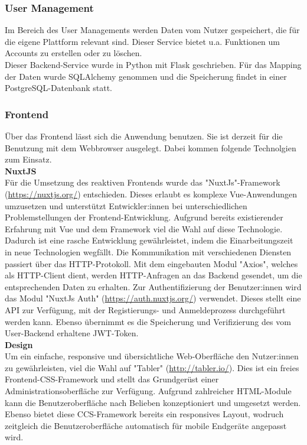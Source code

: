 \subsubsection{User Management}

Im Bereich des User Managements werden Daten vom Nutzer gespeichert, die für die eigene Plattform relevant sind. Dieser Service bietet u.a. Funktionen um Accounts zu erstellen oder zu löschen.\\
Dieser Backend-Service wurde in Python mit Flask geschrieben.
Für das Mapping der Daten wurde SQLAlchemy genommen und die Speicherung findet in einer PostgreSQL-Datenbank statt.    

\subsubsection{Frontend}

Über das Frontend lässt sich die Anwendung benutzen. Sie ist derzeit für die Benutzung mit dem Webbrowser ausgelegt. Dabei kommen folgende Technolgien zum Einsatz.  \\

\textbf{NuxtJS} \\

Für die Umsetzung des reaktiven Frontends wurde das "NuxtJs"-Framework (\href{https://nuxtjs.org/}{https://nuxtjs.org/}) entschieden. Dieses erlaubt es komplexe Vue-Anwendungen umzusetzen und unterstützt Entwickler:innen
bei unterschiedlichen Problemstellungen der Frontend-Entwicklung. Aufgrund bereits existierender Erfahrung mit Vue und dem Framework viel die Wahl auf diese Technologie.
Dadurch ist eine rasche Entwicklung gewährleistet, indem die Einarbeitungszeit in neue Technologien wegfällt. Die Kommunikation mit verschiedenen Diensten passiert
über das HTTP-Protokoll. Mit dem eingebauten Modul "Axios", welches als HTTP-Client dient, werden HTTP-Anfragen an das Backend gesendet, um die entsprechenden Daten 
zu erhalten. Zur Authentifizierung der Benutzer:innen wird das Modul "NuxtJs Auth" (\href{https://auth.nuxtjs.org/}{https://auth.nuxtjs.org/}) verwendet. Dieses stellt eine API zur Verfügung, mit der Registierungs- und Anmeldeprozess durchgeführt werden kann.
Ebenso übernimmt es die Speicherung und Verifizierung des vom User-Backend erhaltene JWT-Token. \\

\textbf{Design} \\

Um ein einfache, responsive und übersichtliche Web-Oberfläche den Nutzer:innen zu gewährleisten, viel die Wahl auf "Tabler" (\href{http://tabler.io/}{http://tabler.io/}). Dies ist ein freies Frontend-CSS-Framework
und stellt das Grundgerüst einer Administrationsoberfläche zur Verfügung. Aufgrund zahlreicher HTML-Module kann die Benutzeroberfläche nach Belieben konzeptioniert und 
umgesetzt werden. Ebenso bietet diese CCS-Framework bereits ein responsives Layout, wodruch zeitgleich die Benutzeroberfläche automatisch für mobile Endgeräte angepasst wird.

